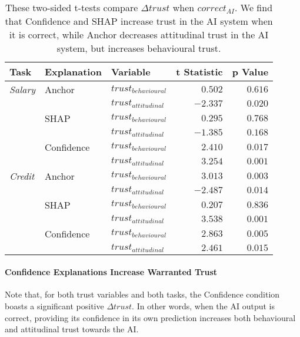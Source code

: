 \begin{table}[htb]
    \centering
    \caption{These two-sided t-tests compare $\Delta trust$ when $correct_{AI}$. We find that Confidence and SHAP increase trust in the AI system when it is correct, while Anchor decreases attitudinal trust in the AI system, but increases behavioural trust.}
    \label{tab:delta-trust-t-positives}
    \begin{tabular}{lllrr}
        \toprule
        Task & Explanation & Variable & t Statistic & p Value \\ 
        \midrule
        \emph{Salary} & Anchor & $trust_{behavioural}$ & $0.502$ & $0.616$ \\
        & & $trust_{attitudinal}$ & $\mathbf{-2.337}$ & $\mathbf{0.020}$ \\
        & SHAP & $trust_{behavioural}$ & $0.295$ & $0.768$ \\
        & & $trust_{attitudinal}$ & $-1.385$ & $0.168$ \\
        & Confidence & $trust_{behavioural}$ & $\mathbf{2.410}$ & $\mathbf{0.017}$ \\
        & & $trust_{attitudinal}$ & $\mathbf{3.254}$ & $\mathbf{0.001}$ \\
        \midrule
        \emph{Credit} & Anchor & $trust_{behavioural}$ & $\mathbf{3.013}$ & $\mathbf{0.003}$ \\
        & & $trust_{attitudinal}$ & $\mathbf{-2.487}$ & $\mathbf{0.014}$ \\
        & SHAP & $trust_{behavioural}$ & $0.207$ & $0.836$ \\
        & & $trust_{attitudinal}$ & $\mathbf{3.538}$ & $\mathbf{0.001}$ \\
        & Confidence & $trust_{behavioural}$ & $\mathbf{2.863}$ & $\mathbf{0.005}$ \\
        & & $trust_{attitudinal}$ & $\mathbf{2.461}$ & $\mathbf{0.015}$ \\
        \bottomrule
    \end{tabular}
\end{table}

\paragraph{Confidence Explanations Increase Warranted Trust}
Note that, for both trust variables and both tasks, the Confidence condition boasts a significant positive $\Delta trust$. In other words, when the AI output is correct, providing its confidence in its own prediction increases both behavioural and attitudinal trust towards the AI.

